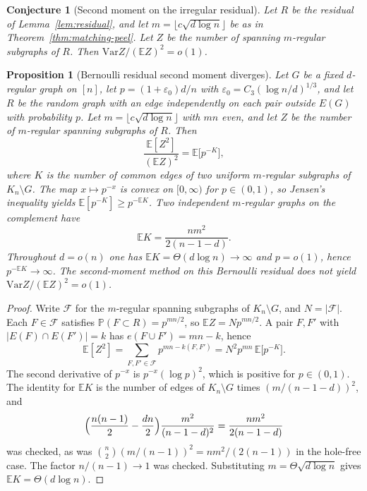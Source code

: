 \documentclass[11pt]{article}
\newtheorem{proposition}[theorem]{Proposition}
\newtheorem{conjecture}[theorem]{Conjecture}
\newcommand{\EE}{\mathbb{E}}
\newcommand{\PP}{\mathbb{P}}
\newcommand{\Var}{\mathrm{Var}}
\begin{document}
\begin{conjecture}[Second moment on the irregular residual]
\label{conj:residual-moment}
Let \(R\) be the residual of Lemma~\ref{lem:residual}, and let \(m=\lfloor c\sqrt{d\log n}\rfloor\) be as in Theorem~\ref{thm:matching-peel}.
Let \(Z\) be the number of spanning \(m\)-regular subgraphs of \(R\).
Then \(\Var Z/(\EE Z)^2=o(1)\).
\end{conjecture}

\begin{proposition}[Bernoulli residual second moment diverges]
\label{prop:bernoulli-moment}
Let \(G\) be a fixed \(d\)-regular graph on \([n]\), let \(p=(1+\varepsilon_0)d/n\) with \(\varepsilon_0=C_3(\log n/d)^{1/3}\), and let \(R\) be the random graph with an edge independently on each pair outside \(E(G)\) with probability \(p\).
Let \(m=\lfloor c\sqrt{d\log n}\rfloor\) with \(mn\) even, and let \(Z\) be the number of \(m\)-regular spanning subgraphs of \(R\).
Then
\[
\frac{\EE[Z^2]}{(\EE Z)^2}
=
\EE\bigl[p^{-K}\bigr],
\]
where \(K\) is the number of common edges of two uniform \(m\)-regular subgraphs of \(K_n\setminus G\).
The map \(x\mapsto p^{-x}\) is convex on \([0,\infty)\) for \(p\in(0,1)\), so Jensen's inequality yields \(\EE[p^{-K}]\ge p^{-\EE K}\).
Two independent \(m\)-regular graphs on the complement have
\[
\EE K
=
\frac{nm^2}{2(n-1-d)}.
\]
Throughout \(d=o(n)\) one has \(\EE K=\Theta(d\log n)\to\infty\) and \(p=o(1)\), hence \(p^{-\EE K}\to\infty\).
The second-moment method on this Bernoulli residual does not yield \(\Var Z/(\EE Z)^2=o(1)\).
\end{proposition}

\begin{proof}
Write \(\mathcal{F}\) for the \(m\)-regular spanning subgraphs of \(K_n\setminus G\), and \(N=|\mathcal{F}|\).
Each \(F\in\mathcal{F}\) satisfies \(\PP(F\subset R)=p^{mn/2}\), so \(\EE Z=Np^{mn/2}\).
A pair \(F,F'\) with \(|E(F)\cap E(F')|=k\) has \(e(F\cup F')=mn-k\), hence
\[
\EE[Z^2]
=
\sum_{F,F'\in\mathcal{F}}p^{mn-k(F,F')}
=
N^2p^{mn}\,\EE\bigl[p^{-K}\bigr].
\]
The second derivative of \(p^{-x}\) is \(p^{-x}(\log p)^2\), which is positive for \(p\in(0,1)\).
The identity for \(\EE K\) is the number of edges of \(K_n\setminus G\) times \((m/(n-1-d))^2\), and
\[
\Bigl(\frac{n(n-1)}{2}-\frac{dn}{2}\Bigr)\frac{m^2}{(n-1-d)^2}
=
\frac{nm^2}{2(n-1-d)}
\]
was checked, as was \(\binom{n}{2}(m/(n-1))^2=nm^2/(2(n-1))\) in the hole-free case.
The factor \(n/(n-1)\to 1\) was checked.
Substituting \(m=\Theta\sqrt{d\log n}\) gives \(\EE K=\Theta(d\log n)\).
\end{proof}
\end{document}

